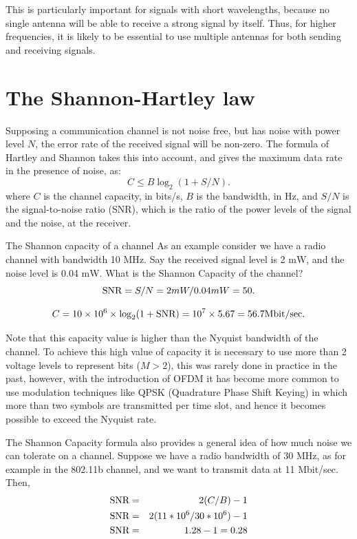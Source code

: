 This is particularly important for signals with short wavelengths, because no single
antenna will be able to receive a strong signal by itself. Thus, for higher frequencies,
it is likely to be essential to use multiple antennas for both sending and receiving signals.

\section{The Shannon-Hartley law}\label{shannonhartley}

Supposing a communication channel is not noise free, but has noise with power level $N$, the
error rate of the received signal will be non-zero. The formula of Hartley and
Shannon takes this into account, and gives the maximum data rate in the presence of noise,
as:
$$
C \leq B \log_{2} (1 + S/N). 
$$
where $C$ is the channel capacity, in bits/s, $B$ is the bandwidth, in Hz, and $S/N$ is the 
signal-to-noise ratio (SNR),
which is the ratio of the power levels of the signal and the noise, 
at the receiver. 

\begin{sbexample}{The Shannon capacity of a channel}
As an example consider we have a radio channel with bandwidth 10
\textsc{MH}z. Say the received signal level is 2 m\textsc{W}, and the
noise level is 0.04 m\textsc{W}. What is the Shannon Capacity of the
channel?  
$$ 
\hbox{SNR} = S/N = 2mW / 0.04 mW = 50 .  
$$

$$
C = 10\times 10^{6} \times \log_{2}(1 + \hbox{SNR}) = 10^{7} \times 5.67 = 56.7 \hbox{Mbit/sec} .
$$
\end{sbexample}


Note that this capacity value is higher than the Nyquist bandwidth of
the channel. To achieve this high value of capacity it is necessary to
use more than 2 voltage levels to represent bits ($M > 2$), this was
rarely done in practice in the past, however, with the introduction of
OFDM it has become more common to use modulation techniques like QPSK
(Quadrature Phase Shift Keying) in which more than two symbols are transmitted per time slot,
and hence it becomes possible to exceed the Nyquist rate.

The Shannon Capacity formula also provides a general idea of how much noise we can 
tolerate on a channel. Suppose we have a radio bandwidth of 30 MHz, as for example in the
802.11b channel, and we want to transmit data at 11 Mbit/sec. Then,
\begin{eqnarray}\nonumber
\hbox{SNR} &=& 2(C/B)-1 \\
\nonumber
\hbox{SNR} &=& 2(11*10^{6}/30*10^{6})-1 \\
\nonumber
\hbox{SNR} &=& 1.28-1=0.28
\end{eqnarray}

